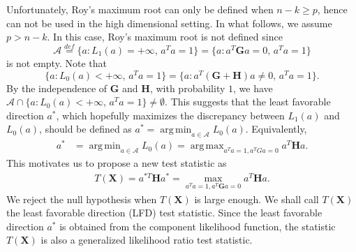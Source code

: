 \documentclass[12pt]{article} %
\DeclareMathOperator*{\argmax}{arg\,max}
\DeclareMathOperator*{\argmin}{arg\,min}
\newcommand{\bX}{\mathbf{X}}
\newcommand{\bH}{\mathbf{H}}
\newcommand{\bG}{\mathbf{G}}
\theoremstyle{definition}
\begin{document}
Unfortunately, Roy's maximum root can only be defined when $n-k\geq p$, hence can not be used in the high dimensional setting.
In what follows, we assume $p>n-k$.
In this case,
Roy's maximum root is not defined since
$$\mathcal{A}\overset{def}{=}\{a:L_1(a)=+\infty, \, a^T a=1\}=\{a:a^T \bG a=0, \, a^T a=1\}$$
is not empty. 
Note that 
$$\{a:L_0(a)<+\infty, \, a^T a=1\}=\{a:a^T (\bG+\bH)a\neq 0, \, a^T a=1\}.$$
By the independence of $\bG$ and $\bH$, with probability $1$, we have $\mathcal{A}\cap \{a:L_0(a)<+\infty,\, a^T a=1\}\neq \emptyset$.
This suggests that the least favorable direction $a^*$, which hopefully maximizes the discrepancy between $L_1(a)$ and $L_0(a)$, should be defined as $a^* = \argmin_{a\in\mathcal{A}} L_0 (a)$.
Equivalently,
$$
\begin{aligned}
    a^*&=\argmin_{a\in \mathcal{A}} L_0(a) = \argmax_{a^T a=1,a^T Ga=0} {a^T \bH a}.
\end{aligned}
$$
This motivates us to propose a new test statistic as
\begin{equation*}
    \begin{aligned}
        T(\bX)=a^{*T} \bH a^*
        =
        \max_{a^T a=1, a^T \bG a=0} 
        a^T \bH a.
    \end{aligned}
\end{equation*}
We reject the null hypothesis when $T(\bX)$ is large enough.
We shall call $T(\bX)$ the least favorable direction (LFD) test statistic.
Since the least favorable direction $a^*$ is obtained from the component likelihood function, the statistic $T(\bX)$ is also a generalized likelihood ratio test statistic.
\end{document}
